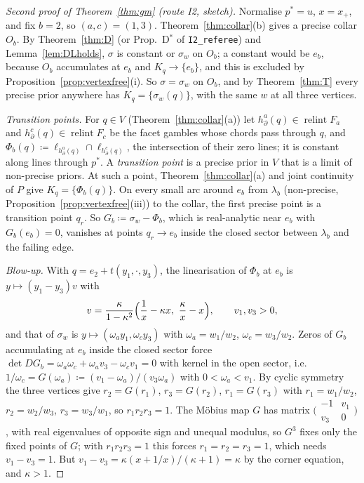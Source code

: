 \documentclass[11pt]{article}
\theoremstyle{definition}
\theoremstyle{remark}
\newcommand{\relint}{\operatorname{relint}}
\newcommand{\src}[1]{\texttt{#1}}
\begin{document}
\begin{proof}[Second proof of Theorem~\ref{thm:gm} (route I2, sketch)]
Normalise $p^*=u$, $x=x_+$, and fix $b=2$, so $(a,c)=(1,3)$. Theorem~\ref{thm:collar}(b) gives a precise collar $O_b$. By Theorem~\ref{thm:D} (or Prop.~D$^*$ of \src{I2\_referee}) and Lemma~\ref{lem:DLholds}, $\sigma$ is constant or $\sigma_w$ on $O_b$; a constant would be $e_b$, because $O_b$ accumulates at $e_b$ and $K_q\to\{e_b\}$, and this is excluded by Proposition~\ref{prop:vertexfree}(i). So $\sigma=\sigma_w$ on $O_b$, and by Theorem~\ref{thm:T} every precise prior anywhere has $K_q=\{\sigma_w(q)\}$, with the same $w$ at all three vertices.

\emph{Transition points.} For $q\in V$ (Theorem~\ref{thm:collar}(a)) let $h^a_\partial(q)\in\relint F_a$ and $h^c_\partial(q)\in\relint F_c$ be the facet gambles whose chords pass through $q$, and $\Phi_b(q)\coloneqq\ell_{h^a_\partial(q)}\cap\ell_{h^c_\partial(q)}$, the intersection of their zero lines; it is constant along lines through $p^*$. A \emph{transition point} is a precise prior in $V$ that is a limit of non-precise priors. At such a point, Theorem~\ref{thm:collar}(a) and joint continuity of $P$ give $K_q=\{\Phi_b(q)\}$. On every small arc around $e_b$ from $\lambda_b$ (non-precise, Proposition~\ref{prop:vertexfree}(iii)) to the collar, the first precise point is a transition point $q_r$. So $G_b\coloneqq\sigma_w-\Phi_b$, which is real-analytic near $e_b$ with $G_b(e_b)=0$, vanishes at points $q_r\to e_b$ inside the closed sector between $\lambda_b$ and the failing edge.

\emph{Blow-up.} With $q=e_2+t(y_1,\cdot,y_3)$, the linearisation of $\Phi_b$ at $e_b$ is $y\mapsto(y_1-y_3)v$ with
\[
v=\frac{\kappa}{1-\kappa^2}\Bigl(\frac1x-\kappa x,\ \frac\kappa x-x\Bigr),\qquad v_1,v_3>0,
\]
and that of $\sigma_w$ is $y\mapsto(\omega_ay_1,\omega_cy_3)$ with $\omega_a=w_1/w_2$, $\omega_c=w_3/w_2$. Zeros of $G_b$ accumulating at $e_b$ inside the closed sector force $\det DG_b=\omega_a\omega_c+\omega_av_3-\omega_cv_1=0$ with kernel in the open sector, i.e.\ $1/\omega_c=G(\omega_a)\coloneqq(v_1-\omega_a)/(v_3\omega_a)$ with $0<\omega_a<v_1$. By cyclic symmetry the three vertices give $r_2=G(r_1)$, $r_3=G(r_2)$, $r_1=G(r_3)$ with $r_1=w_1/w_2$, $r_2=w_2/w_3$, $r_3=w_3/w_1$, so $r_1r_2r_3=1$. The M\"obius map $G$ has matrix $\bigl(\begin{smallmatrix}-1&v_1\\v_3&0\end{smallmatrix}\bigr)$, with real eigenvalues of opposite sign and unequal modulus, so $G^3$ fixes only the fixed points of $G$; with $r_1r_2r_3=1$ this forces $r_1=r_2=r_3=1$, which needs $v_1-v_3=1$. But $v_1-v_3=\kappa(x+1/x)/(\kappa+1)=\kappa$ by the corner equation, and $\kappa>1$.
\end{proof}
\end{document}
